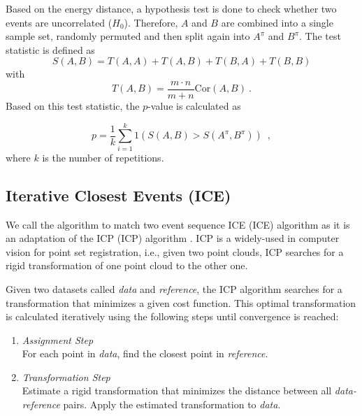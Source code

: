 \documentclass[conference]{IEEEtran}
\theoremstyle{examplestyle}
\begin{document}
Based on the energy distance, a hypothesis test is done to check whether two events are uncorrelated (\(H_0\)).  Therefore, \(A\) and \(B\) are combined into a single sample set, randomly permuted and then split again into \(A^\pi\) and \(B^\pi\). The test statistic is defined as
\begin{equation}
	S(A, B) = T(A, A) + T(A, B) + T(B, A) + T(B, B)
\end{equation}
with
\begin{equation*}
	T(A, B) = \dfrac{m \cdot n}{m + n} \text{Cor}(A, B) ~.
\end{equation*}
Based on this test statistic, the \(p\)-value is calculated as

\begin{equation}
	p = \dfrac{1}{k} \sum_{i = 1}^k 1 \left( S(A, B) > S(A^\pi , B^\pi) \right) \enspace, 
\end{equation}
where \(k\) is the number of repetitions.



\subsection{Iterative Closest Events (ICE)}
\label{sec:ice}

We call the algorithm to match two event sequence  \acl{ICE} (\ac{ICE}) algorithm as it is an adaptation of the \acl{ICP} (\ac{ICP}) algorithm \cite{Besl1992}. \ac{ICP} is a widely-used in computer vision for point set registration, i.e., given two point clouds, \ac{ICP} searches for a rigid transformation of one point cloud to the other one. 

Given two datasets called \textit{data} and \textit{reference}, the \ac{ICP} algorithm searches for a transformation that minimizes a given cost function. This optimal transformation is calculated iteratively using the following steps \cite{Besl1992} until convergence is reached:

\begin{enumerate}
	\item \emph{Assignment Step}\\ 
	   For each point in \textit{data}, find the closest point in \textit{reference}.
	\item \emph{Transformation  Step}\\ Estimate a rigid transformation that minimizes the distance between all \textit{data-reference} pairs. Apply the estimated transformation to \textit{data}.
\end{enumerate}
\end{document}
